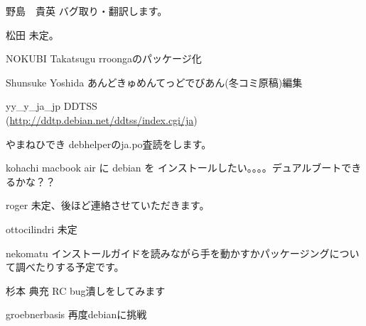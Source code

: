 \begin{prework}{ 野島　貴英 }
バグ取り・翻訳します。
\end{prework}

\begin{prework}{ 松田 }
未定。
\end{prework}

\begin{prework}{ NOKUBI Takatsugu }
rroongaのパッケージ化
\end{prework}

\begin{prework}{ Shunsuke Yoshida }
あんどきゅめんてっどでびあん(冬コミ原稿)編集
\end{prework}

\begin{prework}{ yy\_y\_ja\_jp }
DDTSS \\
(\url{http://ddtp.debian.net/ddtss/index.cgi/ja})
\end{prework}

\begin{prework}{ やまねひでき }
debhelperのja.po査読をします。
\end{prework}

\begin{prework}{ kohachi }
macbook air に debian を インストールしたい。。。。デュアルブートできるかな？？
\end{prework}

\begin{prework}{ roger }
未定、後ほど連絡させていただきます。
\end{prework}

\begin{prework}{ ottocilindri }
未定
\end{prework}

\begin{prework}{ nekomatu }
インストールガイドを読みながら手を動かすかパッケージングについて調べたりする予定です。
\end{prework}

\begin{prework}{ 杉本 典充 }
RC bug潰しをしてみます
\end{prework}

\begin{prework}{ groebnerbasis }
再度debianに挑戦  
\end{prework}
